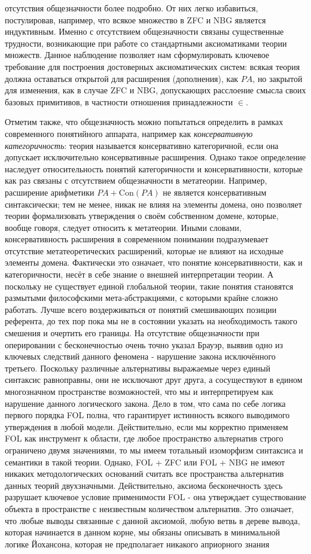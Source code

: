 \documentclass[12pt]{article}
\begin{document}
отсутствия общезначности более подробно. От них легко избавиться, постулировав, например, что всякое множество в ZFC и NBG является индуктивным. Именно с отсутствием общезначности связаны существенные трудности, возникающие при работе со стандартными аксиоматиками теории множеств. Данное наблюдение позволяет нам сформулировать ключевое требование для построения достоверных аксиоматических систем: всякая теория должна оставаться открытой для расширения (дополнения), как $PA$, но закрытой для изменения, как в случае ZFC и NBG, допускающих расслоение смысла своих базовых примитивов, в частности отношения принадлежности $\in$. 

Отметим также, что общезначность можно попытаться определить в рамках современного понятийного аппарата, например как {\it консервативную категоричность}: теория называется консервативно категоричной, если она допускает исключительно консервативные расширения. Однако такое определение наследует относительность понятий категоричности и консервативности, которые как раз связаны с отсутствием общезначности в метатеории. Например, расширение арифметики $PA + \text{Con}(PA)$ не является консервативным синтаксически; тем не менее, никак не влияя на элементы домена, оно позволяет теории формализовать утверждения о своём собственном домене, которые, вообще говоря, следует относить к метатеории. Иными словами, консервативность расширения в современном понимании подразумевает отсутствие метатеоретических расширений, которые не влияют на исходные элементы домена. Фактически это означает, что понятие консервативности, как и категоричности, несёт в себе знание о внешней интерпретации теории. А поскольку не существует единой глобальной теории, такие понятия становятся размытыми философскими мета-абстракциями, с которыми крайне сложно работать. Лучше всего воздерживаться от понятий смешивающих позиции референта, до тех пор пока мы не в состоянии указать на необходимость такого смешения и очертить его границы. На отсутствие общезначности при оперировании с бесконечностью очень точно указал Брауэр, выявив одно из ключевых следствий данного феномена - нарушение закона исключённого третьего. Поскольку различные альтернативы выражаемые через единый синтаксис равноправны, они не исключают друг друга, а сосуществуют в едином многозначном пространстве возможностей, что мы и интерпретируем как нарушение данного логического закона. Дело в том, что сама по себе логика первого порядка FOL полна, что гарантирует истинность всякого выводимого утверждения в любой модели. Действительно, если мы корректно применяем FOL как инструмент к области, где любое пространство альтернатив строго ограничено двумя значениями, то мы имеем тотальный изоморфизм синтаксиса и семантики в такой теории. Однако, FOL + ZFC или FOL + NBG не имеют никаких методологических оснований считать все пространства альтернатив данных теорий двухзначными. Действительно, аксиома бесконечность здесь разрушает ключевое условие применимости FOL - она утверждает существование объекта в пространстве с неизвестным количеством альтернатив. Это означает, что любые выводы связанные с данной аксиомой, любую ветвь в дереве вывода, которая начинается в данном корне, мы обязаны описывать в минимальной логике Йохансона, которая не предполагает никакого априорного знания 
\end{document}
